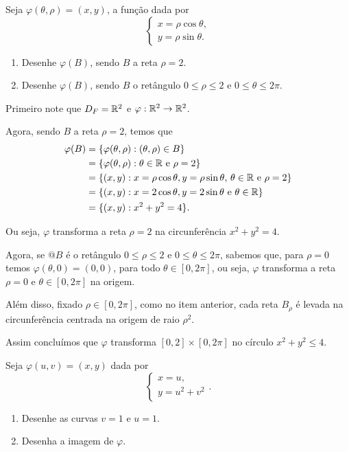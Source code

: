\begin{example}
    Seja \(\varphi(\theta,\rho) = (x,y)\), a função dada por \[\begin{cases}
        x = \rho\cos\theta,\\ y=\rho\sin\theta.
    \end{cases}\]

    \begin{enumerate}
        \item Desenhe \(\varphi(B)\), sendo \(B\) a reta \(\rho = 2\).
        \item Desenhe \(\varphi(B)\), sendo \(B\) o retângulo \(0\leq\rho\leq 2\) e \(0\leq\theta\leq 2\pi\).
    \end{enumerate}

    Primeiro note que \(D_F = \mathbb{R}^2\) e \(\varphi:\mathbb{R}^2\to\mathbb{R} ^2\). 
    
    Agora, sendo \(B\) a reta \(\rho = 2\), temos que
        \begin{align*}
            \varphi(B)
                & = \{\varphi(\theta,\rho) : (\theta,\rho)\in B\} \\
                & = \{\varphi(\theta,\rho) : \theta\in\mathbb{R} \text{ e } \rho=2\} \\
                & = \{(x,y) : x = \rho\cos\theta, y = \rho\sin\theta,\, \theta\in\mathbb{R} \text{ e } \rho=2\} \\
                & = \{(x,y): x = 2\cos\theta, y = 2\sin\theta \text{ e } \theta\in\mathbb{R}\} \\
                & = \{(x,y) : x^2 + y^2 = 4\}.
        \end{align*}

        Ou seja, \(\varphi\) transforma a reta \(\rho=2\) na circunferência \(x^2 + y^2 = 4\).

        Agora, se \(@B\) é o retângulo \(0\leq\rho\leq 2\) e \(0\leq\theta\leq 2\pi\), sabemos que, para \(\rho = 0\) temos \(\varphi(\theta,0) = (0,0)\), para todo \(\theta\in[0,2\pi]\), ou seja, \(\varphi\) transforma a reta \(\rho=0\) e \(\theta\in[0,2\pi]\) na origem.

        Além disso, fixado \(\rho\in[0,2\pi]\), como no item anterior, cada reta \(B_\rho\) é levada na circunferência centrada na origem de raio \(\rho^2\).

        Assim concluímos que \(\varphi\) transforma \([0,2]\times[0,2\pi]\) no círculo \(x^2 + y^2 \leq 4\).
\end{example}

\begin{exercise}
    Seja \(\varphi(u,v) = (x,y)\) dada por \[\begin{cases}
        x=u,\\y=u^2+v^2
    \end{cases}.\]

    \begin{enumerate}
        \item Desenhe as curvas \(v=1\) e \(u=1\).
        \item Desenha a imagem de \(\varphi\).
    \end{enumerate}
\end{exercise}

